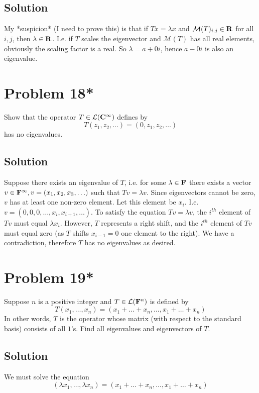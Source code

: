 \documentclass{article}
\begin{document}
\subsection*{Solution}
My *suspicion* (I need to prove this) is that if $Tx=\lambda x$ and $\mathcal{M}(T)_{i,j}\in\mathbf{R}$ for all $i,j$, then $\lambda\in\mathbf{R}$. I.e. if $T$ scales the eigenvector and $\mathcal{M}(T)$ has all real elements, obviously the scaling factor is a real. So $\lambda=a+0i$, hence $a-0i$ is also an eigenvalue.

\section*{Problem 18*}
Show that the operator $T\in\mathcal{L}(\mathbf{C}^{\infty})$ defines by
\[T(z_1,z_2,\ldots)=(0,z_1,z_2,\ldots)\]
has no eigenvalues.

\subsection*{Solution}

Suppose there exists an eigenvalue of $T$, i.e. for some $\lambda\in\mathbf{F}$ there exists a vector $v\in\mathbf{F}^\infty, v=(x_1, x_2, x_3,\ldots)$ such that $Tv=\lambda v$. Since eigenvectors cannot be zero, $v$ has at least one non-zero element. Let this element be $x_i$. I.e. $v=(0,0,0,\ldots,x_i, x_{i+1}, \ldots)$. To satisfy the equation $Tv=\lambda v$, the $i^{th}$ element of $Tv$ must equal $\lambda x_i$. However, $T$ represents a right shift, and the $i^{th}$ element of $Tv$ must equal zero (as $T$ shifts $x_{i-1}=0$ one element to the right). We have a contradiction, therefore $T$ has no eigenvalues as desired.



\section*{Problem 19*}
Suppose $n$ is a positive integer and $T\in\mathcal{L}(\mathbf{F}^n)$ is defined by
\[T(x_1,\ldots,x_n)=(x_1+\ldots+x_n,\ldots,x_1+\ldots+x_n)\]
In other words, $T$ is the operator whose matrix (with respect to the standard basis) consists of all $1$'s. Find all eigenvalues and eigenvectors of $T$.

\subsection*{Solution}

We must solve the equation
\[(\lambda x_1,\ldots,\lambda x_n)=(x_1+\ldots+x_n,\ldots,x_1+\ldots+x_n)\]
\end{document}
